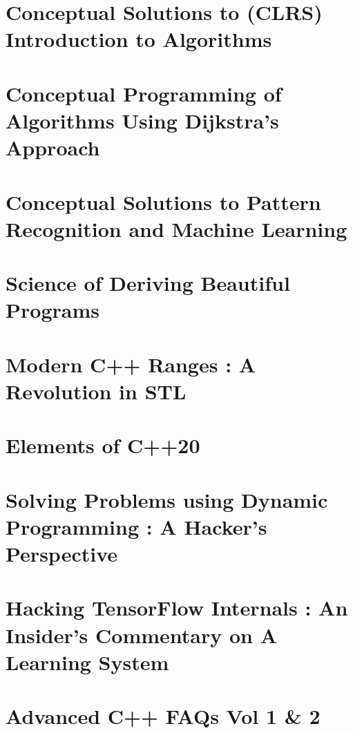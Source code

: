 \documentclass[makeidx, 12pt, oneside, onecolumn, openright, final, svgnames, dvipsnames, extrafontsizes]{memoir}
\theoremstyle{problemstyle}
\begin{document}
\chapter{Conceptual Solutions to (CLRS) Introduction to Algorithms}

\chapter{Conceptual Programming of Algorithms Using Dijkstra’s Approach}

\chapter{Conceptual Solutions to Pattern Recognition and Machine Learning}

\chapter{Science of Deriving Beautiful Programs}

\chapter{Modern C++ Ranges : A Revolution in STL}

\chapter{Elements of C++20}


\chapter{Solving Problems using Dynamic Programming : A Hacker’s Perspective}



\chapter{Hacking TensorFlow Internals : An Insider’s Commentary on A Learning System}

\chapter{Advanced C++ FAQs Vol 1 \& 2}
\end{document}
